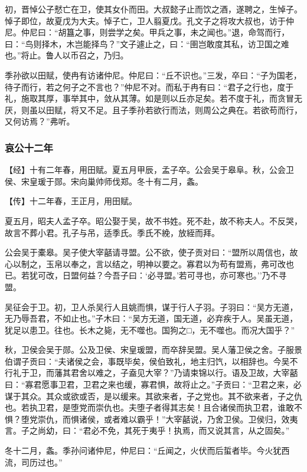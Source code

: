 \documentclass[]{article}
\begin{document}
初，晋悼公子憖亡在卫，使其女仆而田。大叔懿子止而饮之酒，遂聘之，生悼子。悼子即位，故夏戊为大夫。悼子亡，卫人翦夏戊。孔文子之将攻大叔也，访于仲尼。仲尼曰：``胡簋之事，则尝学之矣。甲兵之事，未之闻也。''退，命驾而行，曰：``鸟则择木，木岂能择鸟？''文子遽止之，曰：``圉岂敢度其私，访卫国之难也。''将止。鲁人以币召之，乃归。

季孙欲以田赋，使冉有访诸仲尼。仲尼曰：``丘不识也。''三发，卒曰：``子为国老，待子而行，若之何子之不言也？''仲尼不对。而私于冉有曰：``君子之行也，度于礼，施取其厚，事举其中，敛从其薄。如是则以丘亦足矣。若不度于礼，而贪冒无厌，则虽以田赋，将又不足。且子季孙若欲行而法，则周公之典在。若欲苟而行，又何访焉？''弗听。

\hypertarget{header-n3168}{%
\subsubsection{哀公十二年}\label{header-n3168}}

【经】十有二年春，用田赋。夏五月甲辰，孟子卒。公会吴于皋阜。秋，公会卫侯、宋皇瑗于郧。宋向巢帅师伐郑。冬十有二月，螽。

【传】十二年春，王正月，用田赋。

夏五月，昭夫人孟子卒。昭公娶于吴，故不书姓。死不赴，故不称夫人。不反哭，故言不葬小君。孔子与吊，适季氏。季氏不絻，放絰而拜。

公会吴于橐皋。吴子使大宰嚭请寻盟。公不欲，使子贡对曰：``盟所以周信也，故心以制之，玉帛以奉之，言以结之，明神以要之。寡君以为苟有盟焉，弗可改也已。若犹可改，日盟何益？今吾子曰：`必寻盟。'若可寻也，亦可寒也。''乃不寻盟。

吴征会于卫。初，卫人杀吴行人且姚而惧，谋于行人子羽。子羽曰：``吴方无道，无乃辱吾君，不如止也。''子木曰：``吴方无道，国无道，必弃疾于人。吴虽无道，犹足以患卫。往也。长木之毙，无不噬也。国狗之□，无不噬也。而况大国乎？''

秋，卫侯会吴于郧。公及卫侯、宋皇瑗盟，而卒辞吴盟。吴人藩卫侯之舍。子服景伯谓子贡曰：``夫诸侯之会，事既毕矣，侯伯致礼，地主归饩，以相辞也。今吴不行礼于卫，而藩其君舍以难之，子盍见大宰？''乃请束锦以行。语及卫故，大宰嚭曰：``寡君愿事卫君，卫君之来也缓，寡君惧，故将止之。''子贡曰：``卫君之来，必谋于其众。其众或欲或否，是以缓来。其欲来者，子之党也。其不欲来者，子之仇也。若执卫君，是堕党而崇仇也。夫堕子者得其志矣！且合诸侯而执卫君，谁敢不惧？堕党崇仇，而惧诸侯，或者难以霸乎！''大宰嚭说，乃舍卫侯。卫侯归，效夷言。子之尚幼，曰：``君必不免，其死于夷乎！执焉，而又说其言，从之固矣。''

冬十二月，螽。季孙问诸仲尼，仲尼曰：``丘闻之，火伏而后蜇者毕。今火犹西流，司历过也。''
\end{document}

